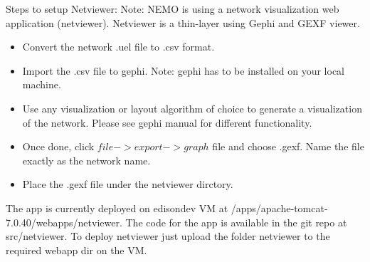 Steps to setup Netviewer:
Note: NEMO is using a network visualization web application (netviewer). Netviewer is a thin-layer using Gephi and GEXF viewer. 
\begin{itemize}
\item Convert the network .uel file to .csv format.
\item Import the .csv file to gephi. Note: gephi has to be installed on your local machine.
\item Use any visualization or layout algorithm of choice to generate a visualization of the network. Please see gephi manual for different functionality.
\item Once done, click $file->export->graph$ file and choose .gexf. Name the file exactly as the network name.
\item Place the .gexf file under the netviewer dirctory.


\end{itemize}
The app is currently deployed on edisondev VM at /apps/apache-tomcat-7.0.40/webapps/netviewer. The code for the app is available in the git repo at src/netviewer. To deploy netviewer just upload the folder netviewer to the required webapp dir on the VM. 
